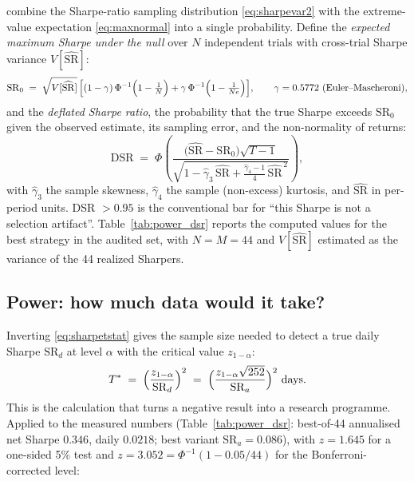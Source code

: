 \cite{bailey2014deflated} combine the Sharpe-ratio sampling distribution
\eqref{eq:sharpevar2} with the extreme-value expectation \eqref{eq:maxnormal} into a
single probability. Define the \emph{expected maximum Sharpe under the null} over $N$
independent trials with cross-trial Sharpe variance $V[\widehat{\mathrm{SR}}]$:
\begin{equation}
  \mathrm{SR}_0 \;=\; \sqrt{V[\widehat{\mathrm{SR}}]}\,\Bigl[(1-\gamma)\,
  \Phi^{-1}\Bigl(1-\tfrac1N\Bigr) + \gamma\,\Phi^{-1}\Bigl(1-\tfrac{1}{N e}\Bigr)\Bigr],
  \qquad \gamma = 0.5772\ \text{(Euler--Mascheroni)},
  \label{eq:sr0}
\end{equation}
and the \emph{deflated Sharpe ratio}, the probability that the true Sharpe exceeds
$\mathrm{SR}_0$ given the observed estimate, its sampling error, and the non-normality of
returns:
\begin{equation}
  \mathrm{DSR} \;=\; \Phi\!\left(
  \frac{\bigl(\widehat{\mathrm{SR}}-\mathrm{SR}_0\bigr)\sqrt{T-1}}
       {\sqrt{1-\hat\gamma_3\,\widehat{\mathrm{SR}} + \frac{\hat\gamma_4-1}{4}\,
        \widehat{\mathrm{SR}}^{\,2}}}\right),
  \label{eq:dsr}
\end{equation}
with $\hat\gamma_3$ the sample skewness, $\hat\gamma_4$ the sample (non-excess) kurtosis,
and $\widehat{\mathrm{SR}}$ in per-period units. DSR $>0.95$ is the conventional bar for
``this Sharpe is not a selection artifact''. Table~\ref{tab:power_dsr} reports the
computed values for the best strategy in the audited set, with $N=M=44$ and
$V[\widehat{\mathrm{SR}}]$ estimated as the variance of the 44 realized Sharpers.

\subsection{Power: how much data would it take?}
\label{sec:mt:power}

Inverting \eqref{eq:sharpetstat} gives the sample size needed to detect a true daily
Sharpe $\mathrm{SR}_d$ at level $\alpha$ with the critical value $z_{1-\alpha}$:
\begin{equation}
  T^{\ast} \;=\; \Bigl(\frac{z_{1-\alpha}}{\mathrm{SR}_d}\Bigr)^{2}
  \;=\; \Bigl(\frac{z_{1-\alpha}\sqrt{252}}{\mathrm{SR}_a}\Bigr)^{2}\ \text{days}.
  \label{eq:requiredT}
\end{equation}
This is the calculation that turns a negative result into a research programme. Applied to
the measured numbers (Table~\ref{tab:power_dsr}: best-of-44 annualised net Sharpe
$0.346$, daily $0.0218$; best  variant $\mathrm{SR}_a=0.086$), with
$z=1.645$ for a one-sided 5\% test and $z=3.052=\Phi^{-1}(1-0.05/44)$ for the
Bonferroni-corrected level:

